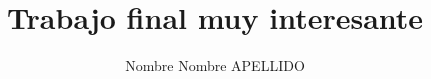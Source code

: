 %
%
%
%
%
%  






%



\usepackage{titling}
\title{Trabajo final muy interesante}
\author{Nombre Nombre APELLIDO}









